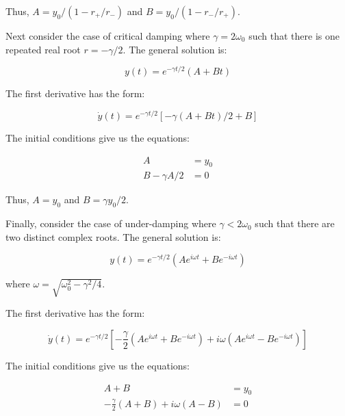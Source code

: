 \documentclass[12pt]{article}
\begin{document}
Thus, $A = y_{0}/(1 - r_{+}/r_{-})$ and $B = y_{0}/(1 - r_{-}/r_{+})$.


Next consider the case of critical damping where $\gamma = 2 \omega_{0}$ such that there is one repeated real root $r = -\gamma/2$. The general solution is:

\begin{equation}
    y(t) = e^{-\gamma t/2} (A + B t)
\end{equation}

The first derivative has the form:

\begin{equation}
    \dot{y}(t) = e^{-\gamma t/2}\left[ -\gamma (A + B t)/2 + B \right]
\end{equation}

The initial conditions give us the equations:

\begin{equation}
    \begin{split}
        A &= y_{0} \\
        B - \gamma A/2 &= 0
    \end{split}
\end{equation}

Thus, $A = y_{0}$ and $B = \gamma y_{0}/2$.


Finally, consider the case of under-damping where $\gamma < 2 \omega_{0}$ such that there are two distinct complex roots. The general solution is:

\begin{equation}
    y(t) = e^{-\gamma t/2} (A e^{i \omega t} + B e^{-i \omega t})
\end{equation}

where $\omega = \sqrt{\omega_{0}^{2} - \gamma^{2}/4}$.

The first derivative has the form:

\begin{equation}
    \dot{y}(t) = e^{-\gamma t/2} \left[ -\frac{\gamma}{2} (A e^{i \omega t} + B e^{-i \omega t}) + i\omega (A e^{i \omega t} - B e^{-i \omega t}) \right]
\end{equation}

The initial conditions give us the equations:

\begin{equation}
    \begin{split}
        A + B &= y_{0} \\
        -\frac{\gamma}{2} (A + B) + i\omega (A - B) &= 0
    \end{split}
\end{equation}
\end{document}
